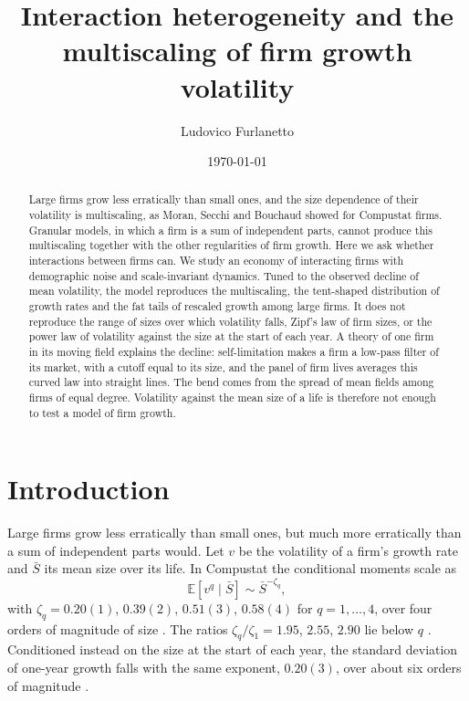 \documentclass[pre,twocolumn,superscriptaddress,nofootinbib]{revtex4-2}
\newcommand{\E}{\mathbb E}
\newcommand{\Sb}{\bar S}
\begin{document}
\title{Interaction heterogeneity and the multiscaling of firm growth volatility}
\author{Ludovico Furlanetto}
\date{\today}

\begin{abstract}
Large firms grow less erratically than small ones, and the size dependence of their volatility is multiscaling,
as Moran, Secchi and Bouchaud showed for Compustat firms.  Granular models, in which a firm is a sum of
independent parts, cannot produce this multiscaling together with the other regularities of firm growth.  Here
we ask whether interactions between firms can.  We study an economy of interacting firms with demographic noise
and scale-invariant dynamics.  Tuned to the observed decline of mean volatility, the model reproduces the multiscaling, the
tent-shaped distribution of growth rates and the fat tails of rescaled growth among large firms.  It does not
reproduce the range of sizes over which volatility falls, Zipf's law of firm sizes, or the power law of volatility
against the size at the start of each year.  A theory of one firm in its moving field explains the decline:
self-limitation makes a firm a low-pass filter of its market, with a cutoff equal to its size, and the panel of firm
lives averages this curved law into straight lines.  The bend comes from the spread of mean fields among firms of
equal degree.  Volatility against the mean size of a life is therefore not enough to test a model of firm growth.
\end{abstract}

\maketitle

\section{Introduction}
\label{sec:intro}

Large firms grow less erratically than small ones, but much more erratically than a sum of independent
parts would.  Let $v$ be the volatility of a firm's growth rate and $\Sb$ its mean size over its life.  In
Compustat the conditional moments scale as
\begin{equation}
\E[v^q\mid\Sb]\sim\Sb^{-\zeta_q},
\label{eq:zeta}
\end{equation}
with $\zeta_q=0.20(1)$, $0.39(2)$, $0.51(3)$, $0.58(4)$ for $q=1,\dots,4$, over four orders of magnitude of size
\cite{stanley1996,amaral1997,sutton2002,moran2024}.  The ratios $\zeta_q/\zeta_1=1.95$, $2.55$, $2.90$ lie
below $q$ \cite{moran2024}.  Conditioned instead on the size at the start of each year, the standard deviation of
one-year growth falls with the same exponent, $0.20(3)$, over about six orders of magnitude \cite{amaral1997}.
\end{document}
